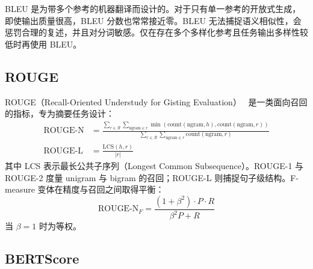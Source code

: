 \begin{warningbox}[BLEU 的局限]
BLEU 是为带多个参考的机器翻译而设计的。对于只有单一参考的开放式生成，即使输出质量很高，BLEU 分数也常常接近零。BLEU 无法捕捉语义相似性，会惩罚合理的复述，并且对分词敏感。仅在存在多个多样化参考且任务输出多样性较低时再使用 BLEU。
\end{warningbox}

\subsection{ROUGE}
\label{rouge}

ROUGE（Recall-Oriented Understudy for Gisting Evaluation）~\cite{lin2004rouge} 是一类面向召回的指标，专为摘要任务设计：
\begin{align}
    \text{ROUGE-N} &= \frac{\sum_{r \in \mathcal{R}} \sum_{\text{ngram} \in r} \min(\text{count}(\text{ngram}, h), \text{count}(\text{ngram}, r))}{\sum_{r \in \mathcal{R}} \sum_{\text{ngram} \in r} \text{count}(\text{ngram}, r)} \\[6pt]
    \text{ROUGE-L} &= \frac{\text{LCS}(h, r)}{|r|}
\end{align}
其中 LCS 表示最长公共子序列（Longest Common Subsequence）。ROUGE-1 与 ROUGE-2 度量 unigram 与 bigram 的召回；ROUGE-L 则捕捉句子级结构。F-measure 变体在精度与召回之间取得平衡：
\begin{equation}
    \text{ROUGE-N}_F = \frac{(1+\beta^2) \cdot P \cdot R}{\beta^2 P + R}
\end{equation}
当 $\beta = 1$ 时为等权。

\subsection{BERTScore}
\label{bertscore}

